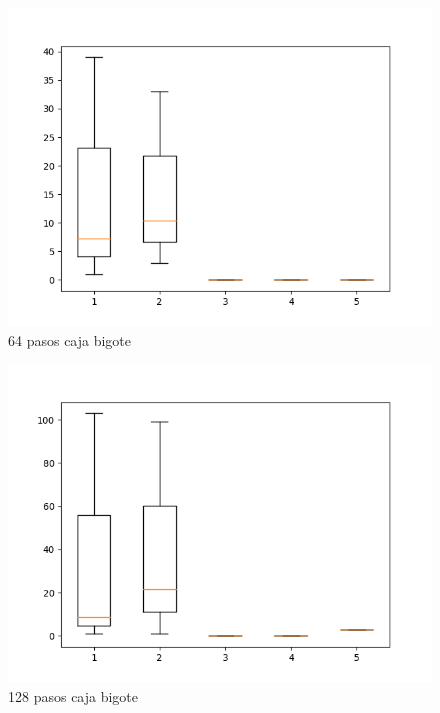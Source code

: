 \documentclass[a4paper]{article}
\begin{document}
    \begin{figure}[H]
      \centering                      %
      \includegraphics[scale=.5]{64_pasos.png}  
      \caption{64 pasos caja bigote} 
      \label{cam64}
    \end{figure}

    \begin{figure}[H]
      \centering                      %
      \includegraphics[scale=.5]{128_pasos.png} 
      \caption{128 pasos caja bigote} 
      \label{cam128}
    \end{figure}
\end{document}
